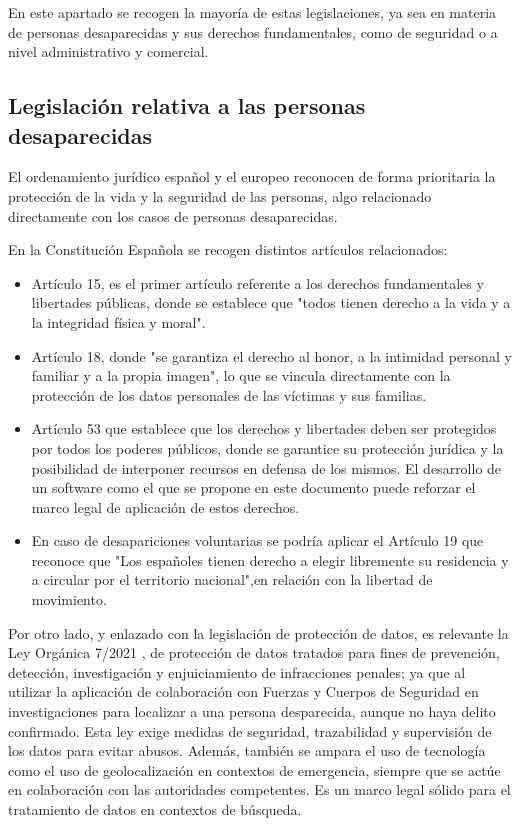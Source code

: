     En este apartado se recogen la mayoría de estas legislaciones, ya sea en materia de personas desaparecidas y sus derechos fundamentales, como de seguridad o a nivel administrativo y comercial.

    
    \subsection{Legislación relativa a las personas desaparecidas}
    El ordenamiento jurídico español y el europeo reconocen de forma prioritaria la protección de la vida y la seguridad de las personas, algo relacionado directamente con los casos de personas desaparecidas. 

    En la Constitución Española \cite{constitucion1978} se recogen distintos artículos relacionados:

    \begin{itemize}
        \item Artículo 15, es el primer artículo referente a los derechos fundamentales y libertades públicas, donde se establece que "todos tienen derecho a la vida y a la integridad física y moral".
        \item Artículo 18, donde "se garantiza el derecho al honor, a la intimidad personal y familiar y a la propia imagen", lo que se vincula directamente con la protección de los datos personales de las víctimas y sus familias. 
        \item Artículo 53 que establece que los derechos y libertades deben ser protegidos por todos los poderes públicos, donde se garantice su protección jurídica y la posibilidad de interponer recursos en defensa de los mismos. El desarrollo de un software como el que se propone en este documento puede reforzar el marco legal de aplicación de estos derechos.
        \item En caso de desapariciones voluntarias se podría aplicar el Artículo 19 que reconoce que "Los españoles tienen derecho a elegir libremente su residencia y a circular por el territorio nacional",en relación con la libertad de movimiento.
        
    \end{itemize}
    Por otro lado, y enlazado con la legislación de protección de datos, es relevante la Ley Orgánica 7/2021 \cite{ley_organica_7_2021}, de protección de datos tratados para fines de prevención, detección, investigación y enjuiciamiento de infracciones penales; ya que al utilizar la aplicación de colaboración con Fuerzas y Cuerpos de Seguridad en investigaciones para localizar a una persona desparecida, aunque no haya delito confirmado. Esta ley exige medidas de seguridad, trazabilidad y supervisión de los datos para evitar abusos. Además, también se ampara el uso de tecnología como el uso de geolocalización en contextos de emergencia, siempre que se actúe en colaboración con las autoridades competentes. Es un marco legal sólido para el tratamiento de datos en contextos de búsqueda.

